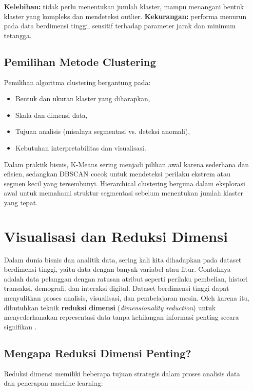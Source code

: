 \textbf{Kelebihan:} tidak perlu menentukan jumlah klaster, mampu menangani bentuk klaster yang kompleks dan mendeteksi outlier.  
\textbf{Kekurangan:} performa menurun pada data berdimensi tinggi, sensitif terhadap parameter jarak dan minimum tetangga.

\subsection*{Pemilihan Metode Clustering}

Pemilihan algoritma clustering bergantung pada:
\begin{itemize}
	\item Bentuk dan ukuran klaster yang diharapkan,
	\item Skala dan dimensi data,
	\item Tujuan analisis (misalnya segmentasi vs. deteksi anomali),
	\item Kebutuhan interpretabilitas dan visualisasi.
\end{itemize}

Dalam praktik bisnis, K-Means sering menjadi pilihan awal karena sederhana dan efisien, sedangkan DBSCAN cocok untuk mendeteksi perilaku ekstrem atau segmen kecil yang tersembunyi. Hierarchical clustering berguna dalam eksplorasi awal untuk memahami struktur segmentasi sebelum menentukan jumlah klaster yang tepat.


\section{Visualisasi dan Reduksi Dimensi}

Dalam dunia bisnis dan analitik data, sering kali kita dihadapkan pada dataset berdimensi tinggi, yaitu data dengan banyak variabel atau fitur. Contohnya adalah data pelanggan dengan ratusan atribut seperti perilaku pembelian, histori transaksi, demografi, dan interaksi digital. Dataset berdimensi tinggi dapat menyulitkan proses analisis, visualisasi, dan pembelajaran mesin. Oleh karena itu, dibutuhkan teknik \textbf{reduksi dimensi} (\textit{dimensionality reduction}) untuk menyederhanakan representasi data tanpa kehilangan informasi penting secara signifikan \cite{kelleher2015fundamentals}.

\subsection*{Mengapa Reduksi Dimensi Penting?}

Reduksi dimensi memiliki beberapa tujuan strategis dalam proses analisis data dan penerapan machine learning:

